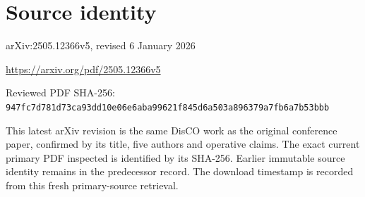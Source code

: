 \documentclass[11pt]{article}
\begin{document}
\section*{Source identity}

arXiv:2505.12366v5, revised 6 January 2026

\url{https://arxiv.org/pdf/2505.12366v5}

Reviewed PDF SHA-256: \nolinkurl{947fc7d781d73ca93dd10e06e6aba99621f845d6a503a896379a7fb6a7b53bbb}

This latest arXiv revision is the same DisCO work as the original conference paper, confirmed by its title, five authors and operative claims. The exact current primary PDF inspected is identified by its SHA-256. Earlier immutable source identity remains in the predecessor record. The download timestamp is recorded from this fresh primary-source retrieval.
\end{document}
